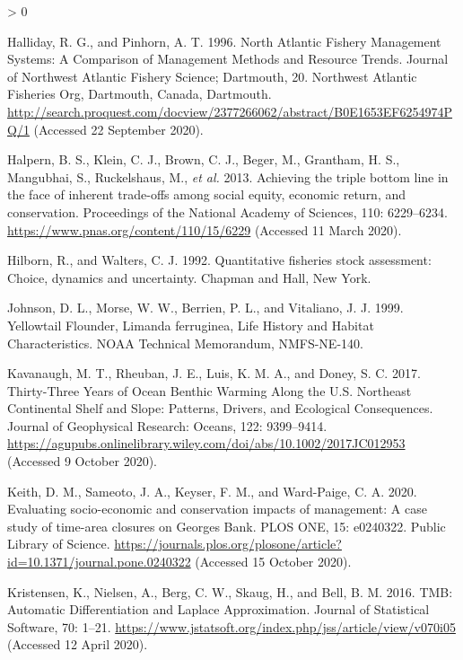 \documentclass[
]{article}
\newlength{\cslhangindent}
\newenvironment{CSLReferences}[2] %
 {%
  \setlength{\parindent}{0pt}
  \ifodd #1 \everypar{\setlength{\hangindent}{\cslhangindent}}\ignorespaces\fi
  \ifnum #2 > 0
  \setlength{\parskip}{#2\baselineskip}
  \fi
 }%
 {}
\begin{document}
\begin{CSLReferences}{1}{0}
\leavevmode\hypertarget{ref-hallidayNorthAtlanticFishery1996}{}%
Halliday, R. G., and Pinhorn, A. T. 1996. North {Atlantic Fishery Management Systems}: {A Comparison} of {Management Methods} and {Resource Trends}. Journal of Northwest Atlantic Fishery Science; Dartmouth, 20. {Northwest Atlantic Fisheries Org}, {Dartmouth, Canada, Dartmouth}. \url{http://search.proquest.com/docview/2377266062/abstract/B0E1653EF6254974PQ/1} (Accessed 22 September 2020).

\leavevmode\hypertarget{ref-halpernAchievingTripleBottom2013}{}%
Halpern, B. S., Klein, C. J., Brown, C. J., Beger, M., Grantham, H. S., Mangubhai, S., Ruckelshaus, M., \emph{et al.} 2013. Achieving the triple bottom line in the face of inherent trade-offs among social equity, economic return, and conservation. Proceedings of the National Academy of Sciences, 110: 6229--6234. \url{https://www.pnas.org/content/110/15/6229} (Accessed 11 March 2020).

\leavevmode\hypertarget{ref-hilbornQuantitativeFisheriesStock1992}{}%
Hilborn, R., and Walters, C. J. 1992. Quantitative fisheries stock assessment: Choice, dynamics and uncertainty. {Chapman and Hall}, {New York}.

\leavevmode\hypertarget{ref-johnsonYellowtailFlounderLimanda1999}{}%
Johnson, D. L., Morse, W. W., Berrien, P. L., and Vitaliano, J. J. 1999. Yellowtail {Flounder}, {Limanda} ferruginea, {Life History} and {Habitat Characteristics}. NOAA Technical Memorandum, NMFS-NE-140.

\leavevmode\hypertarget{ref-kavanaughThirtyThreeYearsOcean2017}{}%
Kavanaugh, M. T., Rheuban, J. E., Luis, K. M. A., and Doney, S. C. 2017. Thirty-{Three Years} of {Ocean Benthic Warming Along} the {U}.{S}. {Northeast Continental Shelf} and {Slope}: {Patterns}, {Drivers}, and {Ecological Consequences}. Journal of Geophysical Research: Oceans, 122: 9399--9414. \url{https://agupubs.onlinelibrary.wiley.com/doi/abs/10.1002/2017JC012953} (Accessed 9 October 2020).

\leavevmode\hypertarget{ref-keithEvaluatingSocioeconomicConservation2020}{}%
Keith, D. M., Sameoto, J. A., Keyser, F. M., and Ward-Paige, C. A. 2020. Evaluating socio-economic and conservation impacts of management: {A} case study of time-area closures on {Georges Bank}. PLOS ONE, 15: e0240322. {Public Library of Science}. \url{https://journals.plos.org/plosone/article?id=10.1371/journal.pone.0240322} (Accessed 15 October 2020).

\leavevmode\hypertarget{ref-kristensenTMBAutomaticDifferentiation2016}{}%
Kristensen, K., Nielsen, A., Berg, C. W., Skaug, H., and Bell, B. M. 2016. {TMB}: {Automatic Differentiation} and {Laplace Approximation}. Journal of Statistical Software, 70: 1--21. \url{https://www.jstatsoft.org/index.php/jss/article/view/v070i05} (Accessed 12 April 2020).


\end{CSLReferences}
\end{document}
